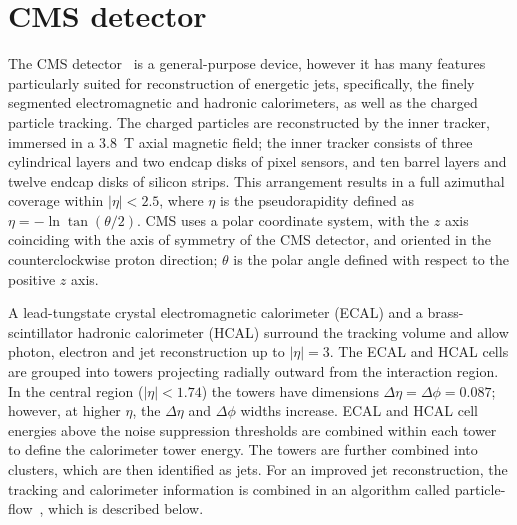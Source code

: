 \newpage
\section{CMS detector}
\label{sec:cms_detector}


The CMS detector~\cite{:2008zzk}
is a general-purpose device, however it has
many features particularly suited for reconstruction of 
energetic jets, specifically, the finely segmented electromagnetic
and hadronic calorimeters, as well as the charged particle tracking.
The charged particles are reconstructed by the inner tracker,
immersed in a $3.8$~T axial magnetic field; the inner tracker consists
of three cylindrical layers and two endcap disks of pixel sensors, and ten
barrel layers and twelve endcap disks of silicon strips.  This
arrangement results
in a full azimuthal coverage within $|\eta| < 2.5$, where $\eta$
is the pseudorapidity defined as $\eta = -\ln\tan(\theta/2)$.
CMS uses a polar coordinate system, with the 
$z$ axis coinciding with the axis of symmetry of the CMS detector,
and oriented in the counterclockwise proton direction; $\theta$ 
is the polar angle defined with respect to the positive $z$ axis.

A lead-tungstate crystal electromagnetic calorimeter (ECAL) and 
a brass-scintillator hadronic calorimeter (HCAL) surround the tracking
volume and allow photon, electron and jet reconstruction up to $|\eta|=3$.
The ECAL and HCAL cells are grouped into towers projecting radially 
outward from the interaction region.  In the central region ($|\eta|<1.74$)
the towers have dimensions $\Delta\eta = \Delta\phi = 0.087$; however,
at higher $\eta$, the $\Delta\eta$ and $\Delta\phi$ widths increase.  
ECAL and HCAL
cell energies above the noise suppression thresholds are combined within
each tower to define the calorimeter tower energy. The towers are further
combined into clusters, which are then identified as jets.  For an improved
jet reconstruction, the tracking and calorimeter information is combined 
in an algorithm called particle-flow~\cite{particleflow}, which is described
below.
